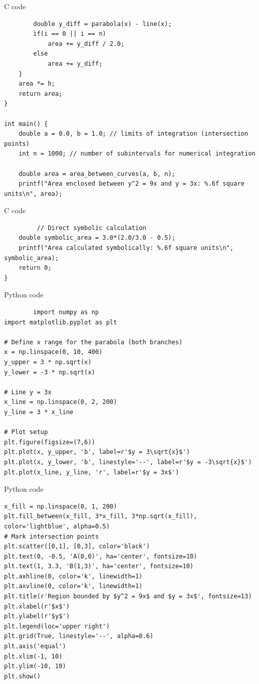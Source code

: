 \documentclass{beamer}
\begin{document}
\begin{frame}[fragile]{C code}
    \begin{lstlisting}
        double y_diff = parabola(x) - line(x);
        if(i == 0 || i == n)
            area += y_diff / 2.0;
        else
            area += y_diff;
    }
    area *= h;
    return area;
}

int main() {
    double a = 0.0, b = 1.0; // limits of integration (intersection points)
    int n = 1000; // number of subintervals for numerical integration

    double area = area_between_curves(a, b, n);
    printf("Area enclosed between y^2 = 9x and y = 3x: %.6f square units\n", area);
    \end{lstlisting}
\end{frame}

\begin{frame}[fragile]{C code}
    \begin{lstlisting}
         // Direct symbolic calculation
    double symbolic_area = 3.0*(2.0/3.0 - 0.5);
    printf("Area calculated symbolically: %.6f square units\n", symbolic_area);
    return 0;
}
    \end{lstlisting}
\end{frame}

\begin{frame}[fragile]{Python code}
    \begin{lstlisting}
        import numpy as np
import matplotlib.pyplot as plt

# Define x range for the parabola (both branches)
x = np.linspace(0, 10, 400)
y_upper = 3 * np.sqrt(x)
y_lower = -3 * np.sqrt(x)

# Line y = 3x
x_line = np.linspace(0, 2, 200)
y_line = 3 * x_line

# Plot setup
plt.figure(figsize=(7,6))
plt.plot(x, y_upper, 'b', label=r'$y = 3\sqrt{x}$')
plt.plot(x, y_lower, 'b', linestyle='--', label=r'$y = -3\sqrt{x}$')
plt.plot(x_line, y_line, 'r', label=r'$y = 3x$')
    \end{lstlisting}
\end{frame}

\begin{frame}[fragile]{Python code}
    \begin{lstlisting}
x_fill = np.linspace(0, 1, 200)
plt.fill_between(x_fill, 3*x_fill, 3*np.sqrt(x_fill), color='lightblue', alpha=0.5)
# Mark intersection points
plt.scatter([0,1], [0,3], color='black')
plt.text(0, -0.5, 'A(0,0)', ha='center', fontsize=10)
plt.text(1, 3.3, 'B(1,3)', ha='center', fontsize=10)
plt.axhline(0, color='k', linewidth=1)
plt.axvline(0, color='k', linewidth=1)
plt.title(r'Region bounded by $y^2 = 9x$ and $y = 3x$', fontsize=13)
plt.xlabel(r'$x$')
plt.ylabel(r'$y$')
plt.legend(loc='upper right')
plt.grid(True, linestyle='--', alpha=0.6)
plt.axis('equal')
plt.xlim(-1, 10)
plt.ylim(-10, 10)
plt.show()
    \end{lstlisting}
\end{frame}
\end{document}

